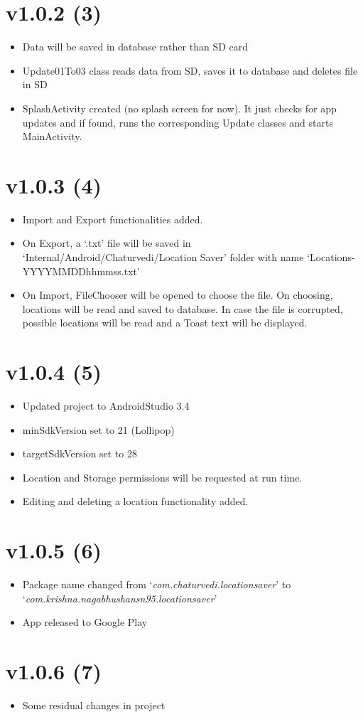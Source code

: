\documentclass{article}
\begin{document}
\section{v1.0.2 (3)}\label{sec:3}
\begin{itemize}
\item Data will be saved in database rather than SD card
\item Update01To03 class reads data from SD, saves it to database and deletes file in SD
\item SplashActivity created (no splash screen for now). It just checks for app updates and if found, runs the corresponding Update classes and starts MainActivity.
\end{itemize}

\section{v1.0.3 (4)}\label{sec:4}
\begin{itemize}
\item Import and Export functionalities added.
\item On Export, a `.txt' file will be saved in `Internal/Android/Chaturvedi/Location Saver' folder with name `Locations-YYYYMMDDhhmmss.txt'
\item On Import, FileChooser will be opened to choose the file. On choosing, locations will be read and saved to database. In case the file is corrupted, possible locations will be read and a Toast text will be displayed.
\end{itemize}

\section{v1.0.4 (5)}\label{sec:5}
\begin{itemize}
\item Updated project to AndroidStudio 3.4
\item minSdkVersion set to 21 (Lollipop)
\item targetSdkVersion set to 28
\item Location and Storage permissions will be requested at run time.
\item Editing and deleting a location functionality added.
\end{itemize}

\section{v1.0.5 (6)}\label{sec:6}
\begin{itemize}
\item Package name changed from `\textit{com.chaturvedi.locationsaver}' to `\textit{com.krishna.nagabhushansn95.locationsaver}'
\item App released to Google Play
\end{itemize}

\section{v1.0.6 (7)}\label{sec:7}
\begin{itemize}
\item Some residual changes in project
\end{itemize}
\end{document}
